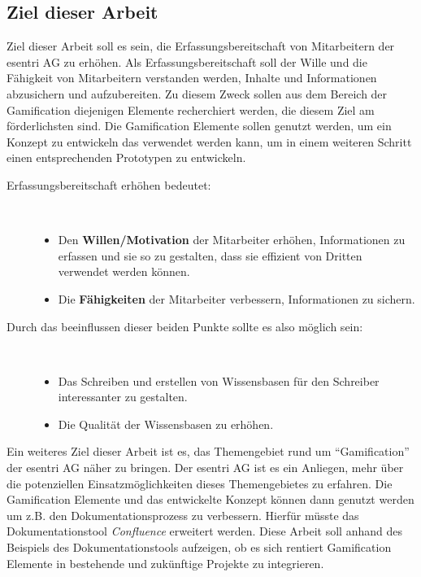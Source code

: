 \documentclass[a4paper,12pt,twoside]{scrartcl}
\begin{document}
\subsection{Ziel dieser Arbeit} 
Ziel dieser Arbeit soll es sein, die Erfassungsbereitschaft von Mitarbeitern der esentri AG zu erhöhen. Als Erfassungsbereitschaft soll der Wille und die Fähigkeit von Mitarbeitern verstanden werden, Inhalte und Informationen abzusichern und aufzubereiten. Zu diesem Zweck sollen aus dem Bereich der Gamification diejenigen Elemente recherchiert werden, die diesem Ziel am förderlichsten sind. Die Gamification Elemente sollen genutzt werden, um ein Konzept zu entwickeln das verwendet werden kann, um in einem weiteren Schritt einen entsprechenden Prototypen zu entwickeln.
\begin{description}
   \item[Erfassungsbereitschaft erhöhen bedeutet:]~\par
   \begin{itemize}
      \item Den \textbf{Willen/Motivation} der Mitarbeiter erhöhen, Informationen zu erfassen und sie so zu gestalten, dass sie effizient von Dritten verwendet werden können.  
      \item Die \textbf{Fähigkeiten} der Mitarbeiter verbessern, Informationen zu sichern.
   \end{itemize}
\end{description}

\begin{description}
   \item[Durch das beeinflussen dieser beiden Punkte sollte es also möglich sein:]~\par
   \begin{itemize}
      \item Das Schreiben und erstellen von Wissensbasen für den Schreiber interessanter zu gestalten.  
      \item Die Qualität der Wissensbasen zu erhöhen.
   \end{itemize}
\end{description}
Ein weiteres Ziel dieser Arbeit ist es, das Themengebiet rund um \enquote{Gamification} der esentri AG näher zu bringen. Der esentri AG ist es ein Anliegen, mehr über die potenziellen Einsatzmöglichkeiten dieses Themengebietes zu erfahren. Die Gamification Elemente und das entwickelte Konzept können dann genutzt werden um z.B. den Dokumentationsprozess zu verbessern. Hierfür müsste das Dokumentationstool \textit{Confluence} erweitert werden. Diese Arbeit soll anhand des Beispiels des Dokumentationstools aufzeigen, ob es sich rentiert Gamification Elemente in bestehende und zukünftige Projekte zu integrieren.  
\end{document}
